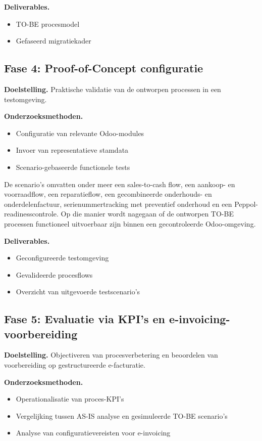\textbf{Deliverables.}
\begin{itemize}
    \item TO-BE procesmodel
    \item Gefaseerd migratiekader
\end{itemize}

\subsection{Fase 4: Proof-of-Concept configuratie}

\textbf{Doelstelling.}  
Praktische validatie van de ontworpen processen in een testomgeving.

\textbf{Onderzoeksmethoden.}
\begin{itemize}
    \item Configuratie van relevante Odoo-modules
    \item Invoer van representatieve stamdata
    \item Scenario-gebaseerde functionele tests
\end{itemize}

De scenario’s omvatten onder meer een sales-to-cash flow, een aankoop- en voorraadflow, een reparatieflow, een gecombineerde onderhouds- en onderdelenfactuur, serienummertracking met preventief onderhoud en een Peppol-readinesscontrole. Op die manier wordt nagegaan of de ontworpen TO-BE processen functioneel uitvoerbaar zijn binnen een gecontroleerde Odoo-omgeving.

\textbf{Deliverables.}
\begin{itemize}
    \item Geconfigureerde testomgeving
    \item Gevalideerde procesflows
    \item Overzicht van uitgevoerde testscenario’s
\end{itemize}

\subsection{Fase 5: Evaluatie via KPI’s en e-invoicing-voorbereiding}

\textbf{Doelstelling.}  
Objectiveren van procesverbetering en beoordelen van voorbereiding op gestructureerde e-facturatie.

\textbf{Onderzoeksmethoden.}
\begin{itemize}
    \item Operationalisatie van proces-KPI’s
    \item Vergelijking tussen AS-IS analyse en gesimuleerde TO-BE scenario’s
    \item Analyse van configuratievereisten voor e-invoicing
\end{itemize}

